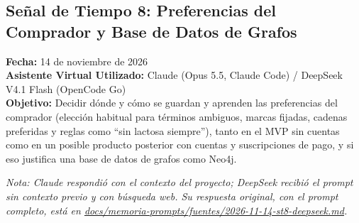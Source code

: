 \subsection{Señal de Tiempo 8: Preferencias del Comprador y Base de Datos de Grafos}
\textbf{Fecha:} 14 de noviembre de 2026 \\
\textbf{Asistente Virtual Utilizado:} Claude (Opus 5.5, Claude Code) / DeepSeek V4.1 Flash (OpenCode Go) \\
\textbf{Objetivo:} Decidir dónde y cómo se guardan y aprenden las preferencias del comprador (elección habitual para términos ambiguos, marcas fijadas, cadenas preferidas y reglas como ``sin lactosa siempre''), tanto en el MVP sin cuentas como en un posible producto posterior con cuentas y suscripciones de pago, y si eso justifica una base de datos de grafos como Neo4j.

\textit{Nota: Claude respondió con el contexto del proyecto; DeepSeek recibió el prompt sin contexto previo y con búsqueda web. Su respuesta original, con el prompt completo, está en \url{docs/memoria-prompts/fuentes/2026-11-14-st8-deepseek.md}.}

